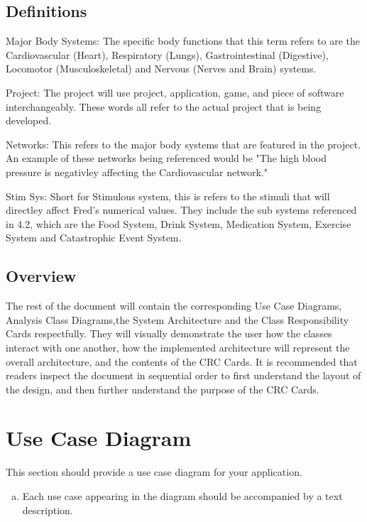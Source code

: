 \documentclass[]{article}
\begin{document}
\subsection{Definitions}
\label{sub:system_description}

	Major Body Systems: The specific body functions that this term refers to are the Cardiovascular (Heart), Respiratory (Lungs), Gastrointestinal (Digestive), Locomotor (Musculoskeletal) and Nervous (Nerves and Brain) systems.

	Project: The project will use project, application, game, and piece of software interchangeably. These words all refer to the actual project that is being developed. 

	Networks: This refers to the major body systems that are featured in the project. An example of these networks being referenced would be "The high blood pressure is negativley affecting the Cardiovascular network."

	Stim Sys: Short for Stimulous system, this is refers to the stimuli that will directley affect Fred's numerical values. They include the sub systems referenced in 4.2, which are the Food System, Drink System, Medication System, Exercise System and Catastrophic Event System.


\subsection{Overview}
\label{sub:overview}
	The rest of the document will contain the corresponding Use Case Diagrams, Analysis Class Diagrams,the System Architecture and the Class Responsibility Cards respectfully. They will visually demonstrate the user how the classes interact with one another, how the implemented architecture will represent the overall architecture, and the contents of the CRC Cards. It is recommended that readers inspect the document in sequential order to first understand the layout of the design, and then further understand the purpose of the CRC Cards.




\section{Use Case Diagram}
\label{sec:use_case_diagram}
This section should provide a use case diagram for your application. 
\begin{enumerate}[a)]
	\item Each use case appearing in the diagram should be accompanied by a text description. 
\end{enumerate}
\end{document}
